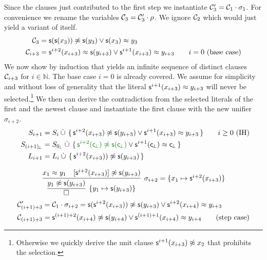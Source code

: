 \begin{example}
Since the clauses just contributed to the first step
we instantiate \( \mathcal{C}'_3 = \mathcal{C}_1\cdot\sigma_1 \).
For convenience we rename the variables \( \mathcal{C}_3 = \mathcal{C}_3'\cdot\rho \).
We ignore \( \mathcal{C}_2 \) which would just yield a variant of itself.
\begin{align*}
	\mathcal{C}_3 &= \mathsf{s}(\mathsf{s}(x_3)) \not\approx \mathsf{s}(y_3) \lor \mathsf{s}(x_3) \approx y_3
	\\
	\mathcal{C}_{i+3} &= \mathsf{s}^{i+2}(x_{i+3})\approx \mathsf{s}(y_{i+3}) \lor \mathsf{s}^{i+1}(x_{i+3})\approx y_{i+3}
	\tag*{\( i=0 \) (base case)}
	\end{align*}
	We now show by induction that \InstGenEQ{} yields an infinite sequence of distinct clauses \( \mathcal{C}_{i+3} \) for \( i\in\mathbb{N} \).
	The base case \( i=0 \) is already covered. We assume for simplicity and without loss of generality that the literal \( \mathsf{s}^{i+1}(x_{i+3})\approx y_{i+3} \) will never be selected.\footnote{
		Otherwise we quickly derive the unit clause \( \mathsf{s}^{i+1}(x_{i+3})\not\approx x_2 \) that prohibits the selection.}
	We then can derive the contradiction from the selected literals of the first and the newest clause
	and instantiate the first clause with the new unifier \( \sigma_{i+2} \).
	\begin{align*}
	S_{i+1} &= S_i\disjointunion \, \{ \,
	\msucc^{i+2}(x_{i+3}) \mNE \msucc(y_{i+3}) \lor \msucc^{i+1}(x_{i+3}) \mEQ y_{i+3} \,
	\}
	\tag*{\( i\geq 0 \) (IH)}
	\\
	S_{(i+1)\!_\bot} &= S_{0\!_\bot}\disjointunion \, \{ \,
	{\colHi\msucc^{i+2}(\consbot) \mNE \msucc(\consbot)} \lor {\msucc^{i+1}(\consbot) \mEQ \consbot} \,
	\}
	\\
	L_{i+1} &= L_i \disjointunion \, \{ \,
		\msucc^{i+2}(x_{i+3})) \mNE \msucc(y_{i+3})
	 \, \}
	\\[0.7em]
	&\infer[\sigma_{i+2} = \{ x_1\mapsto \msucc^{i+2}(x_{i+3})\}
	]{
		\infer[ \{ y_1\mapsto \msucc(y_{i+3})\}]{\emptyclause}{ y_1\mNE \msucc(y_{i+3}) }
	}
	{x_1 \mEQ y_1 & [\msucc^{i+2}(x_{i+3})]\mNE \msucc(y_{i+3})}
	\\
	\mcC'_{(i+1)+3} &= \mcC_1\cdot\sigma_{i+2} =
	\msucc(\msucc^{i+2}(x_{i+3})) \mNE \msucc(y_{i+3}) \lor \msucc^{i+2}(x_{i+4}) \mEQ y_{i+3}
	\\
	\mcC_{(i+1)+3} &=
	\msucc^{(i+1)+2}(x_{i+4}) \mNE \msucc(y_{i+4}) \lor \msucc^{(i+1)+1}(x_{i+4}) \mEQ y_{i+4}
	\tag{step case}
\end{align*}


\end{example}
